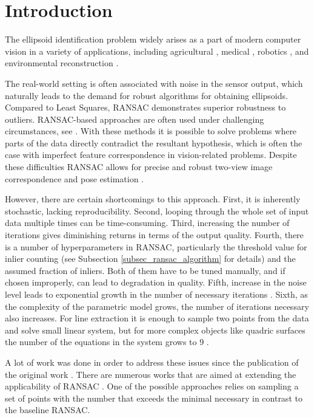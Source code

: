 \section{Introduction}
\label{sec_introduction}

The ellipsoid identification problem widely arises as a part of modern computer vision in a variety of applications, including agricultural \cite{ghahremani2021direct} \cite{xie2021improved}, medical \cite{HOSSEINNEJAD2018325}, robotics \cite{martinez2022ransac}, and environmental reconstruction \cite{li2017improved}.

The real-world setting is often associated with noise in the sensor output, which naturally leads to the demand for robust algorithms for obtaining ellipsoids.
Compared to Least Squares, RANSAC demonstrates superior robustness to outliers.
RANSAC-based approaches are often used under challenging circumstances, see \cite{raguram2008comparative}.
With these methods it is possible to solve problems where parts of the data directly contradict the resultant hypothesis, which is often the case with imperfect feature correspondence in vision-related problems.
Despite these difficulties RANSAC allows for precise and robust two-view image correspondence \cite{torr2000mlesac} \cite{hossein2016image} and pose estimation \cite{lee20201}.

However, there are certain shortcomings to this approach.
First, it is inherently stochastic, lacking reproducibility.
Second, looping through the whole set of input data multiple times can be time-consuming.
Third, increasing the number of iterations gives diminishing returns in terms of the output quality.
Fourth, there is a number of hyperparameters in RANSAC, particularly the threshold value for inlier counting (see Subsection \ref{subsec_ransac_algorithm} for details) and the assumed fraction of inliers.
Both of them have to be tuned manually, and if chosen improperly, can lead to degradation in quality.
Fifth, increase in the noise level leads to exponential growth in the number of necessary iterations \cite{shi2024ransac}.
Sixth, as the complexity of the parametric model grows, the number of iterations necessary also increases.
For line extraction \cite{9856296} it is enough to sample two points from the data and solve small linear system, but for more complex objects like quadric surfaces the number of the equations in the system grows to 9 \cite{han2023robust}.

A lot of work was done in order to address these issues since the publication of the original work \cite{fischler1981random}.
There are numerous works that are aimed at extending the applicability of RANSAC \cite{raguram2008comparative}.
One of the possible approaches relies on sampling a set of points with the number that exceeds the minimal necessary \cite{rosten2010improved} in contrast to the baseline RANSAC.


